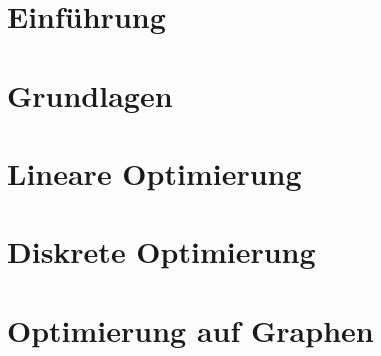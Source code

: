 \documentclass[ngerman, a4paper, 11pt]{report}
\theoremstyle{plain}
\theoremstyle{plain}
\theoremstyle{plain}
\theoremstyle{nonumberplain}
\theoremstyle{nonumberplain}
\theoremstyle{nonumberplain}
\theoremstyle{nonumberplain}
\theoremstyle{proofstyle}
\begin{document}
	\tableofcontents
	\vfill
	{\footnotesize \doclicenseThis }

	\chapter{Einführung}
	\label{chapter_1_einfuehrung}
	
	
	

	\chapter{Grundlagen}
	\label{chapter_2_grundlagen}
	
	
	

	\chapter{Lineare Optimierung}
	\label{chapter_3_lineareOptimierung}
	
	
	
	
	
	

	\chapter{Diskrete Optimierung}
	\label{chapter_4_diskreteOptimierung}
	
	
	
	
	
	\chapter{Optimierung auf Graphen}
	\label{chapter_5_optimierungGraphen}
	
	
	
	
	
\end{document}
